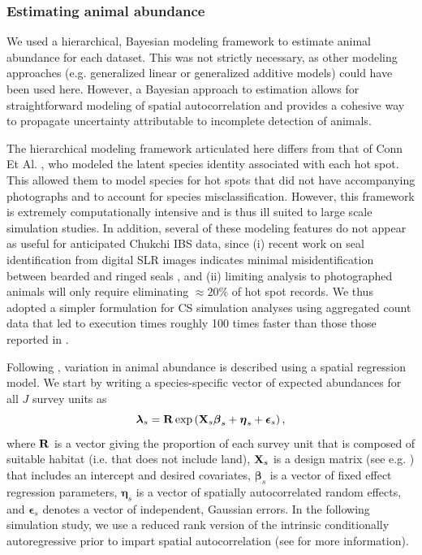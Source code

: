 \documentclass[]{rsos}%
\begin{document}
\subsubsection{Estimating animal abundance}

We used a hierarchical, Bayesian modeling framework to estimate animal abundance for each dataset.  This was not strictly necessary, as other modeling approaches (e.g. generalized linear \cite{McCullaghNelder1989} or generalized additive \cite{Wood2006} models) could have been used here.  However, a Bayesian approach to estimation allows for straightforward modeling of spatial autocorrelation and provides a cohesive way to propagate uncertainty attributable to incomplete detection of animals.

The hierarchical modeling framework articulated here differs from that of
Conn Et Al. \cite{ConnEtAl2014}, who modeled the latent species identity associated with each hot spot. This allowed them to model species for hot spots that did not have accompanying photographs and to account for species misclassification.  However, this framework is extremely computationally intensive and is thus ill suited to large scale simulation studies. In addition, several of these modeling features do not appear as useful for anticipated Chukchi IBS data, since (i) recent work on seal identification from digital SLR images indicates minimal misidentification between bearded and ringed seals \cite{McClintockEtAl2015}, and (ii) limiting analysis to photographed animals will only require eliminating $\approx 20\%$ of hot spot records.  We thus adopted a simpler formulation for CS simulation analyses using aggregated count data that led to execution times roughly 100 times faster than those those reported in \cite{ConnEtAl2014}.

Following \cite{ConnEtAl2014}, variation in animal abundance is described using a spatial regression model.  We start by writing a species-specific vector of expected abundances for all $J$ survey units as
\begin{equation*}
  \boldsymbol{\lambda}_s = {\bf R} \exp \left( {\bf X}_s \boldsymbol{\beta}_s + \boldsymbol{\eta}_s + \boldsymbol{\epsilon}_s \right),
\end{equation*}
where ${\bf R}$ is a vector giving the proportion of each survey unit that is composed of suitable habitat (i.e. that does not include land), ${\bf X}_s$ is a design matrix (see e.g. \cite{Draper1966}) that includes an intercept and desired covariates, $\boldsymbol{\beta}_s$ is a vector of fixed effect regression parameters, $\boldsymbol{\eta}_s$ is a vector of spatially autocorrelated random effects, and $\boldsymbol{\epsilon}_s$ denotes a vector of independent, Gaussian errors.  In the following simulation study, we use a reduced rank version of the intrinsic conditionally autoregressive prior \cite{RueHeld2005} to impart spatial autocorrelation (see \cite{ConnEtAl2014} for more information).
\end{document}

